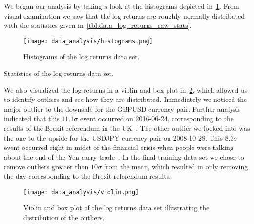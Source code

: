 We began our analysis by taking a look at the histograms depicted in~\cref{fig:histograms_raw}.
From visual examination we saw that the log returns are roughly normally distributed with the statistics given in~\cref{tbl:data_log_returns_raw_stats}.
\begin{figure}[!htb]
    \begin{center}
        \texttt{[image: data\_analysis/histograms.png]}
    \end{center}
    \caption{Histograms of the log returns data set.}
    \label{fig:histograms_raw}
\end{figure}

\begin{table}[!htb]
    \centering
    \begin{adjustbox}{max width=\textwidth}
        
    \end{adjustbox}
    \caption{Statistics of the log returns data set.}
    \label{tbl:data_log_returns_raw_stats}
\end{table}

We also visualized the log returns in a violin and box plot in~\cref{fig:violin_raw}, which allowed us to identify outliers and see how they are distributed.
Immediately we noticed the major outlier to the downside for the GBPUSD currency pair.
Further analysis indicated that this \( 11.1\sigma \) event occurred on 2016-06-24, corresponding to the results of the Brexit referendum in the UK~\cite{brexit_gov_uk}.
The other outlier we looked into was the one to the upside for the USDJPY currency pair on 2008-10-28.
This \( 8.3\sigma \) event occurred right in midst of the financial crisis when people were talking about the end of the Yen carry trade~\cite{jpy_carry_trade_nyt}.
In the final training data set we chose to remove outliers greater than \( 10\sigma \) from the mean, which resulted in only removing the day corresponding to the Brexit referendum results.
\begin{figure}[!htb]
    \begin{center}
        \texttt{[image: data\_analysis/violin.png]}
    \end{center}
    \caption{Violin and box plot of the log returns data set illustrating the distribution of the outliers.}
    \label{fig:violin_raw}
\end{figure}

